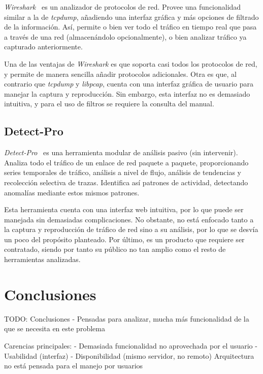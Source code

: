 \textit{Wireshark}~\cite{wireshark} es un analizador de protocolos de red.
Provee una funcionalidad similar a la de \textit{tcpdump}, añadiendo una interfaz gráfica y más opciones de filtrado de la información.
Así, permite o bien ver todo el tráfico en tiempo real que pasa a través de una red (almacenándolo opcionalmente), o bien analizar tráfico ya capturado anteriormente.

Una de las ventajas de \textit{Wireshark} es que soporta casi todos los protocolos de red, y permite de manera sencilla añadir protocolos adicionales.
Otra es que, al contrario que \textit{tcpdump} y \textit{libpcap}, cuenta con una interfaz gráfica de usuario para manejar la captura y reproducción.
Sin embargo, esta interfaz no es demasiado intuitiva, y para el uso de filtros se requiere la consulta del manual.

\subsection*{Detect-Pro\label{sec:eda:detectpro}}

\textit{Detect-Pro}~\cite{detectpro} es una herramienta modular de análisis pasivo (sin intervenir).
Analiza todo el tráfico de un enlace de red paquete a paquete, proporcionando series temporales de tráfico, análisis a nivel de flujo, análisis de tendencias y recolección selectiva de \glspl{traza}.
Identifica así patrones de actividad, detectando anomalías mediante estos mismos patrones.

Esta herramienta cuenta con una interfaz web intuitiva, por lo que puede ser manejada sin demasiadas complicaciones.
No obstante, no está enfocado tanto a la captura y reproducción de tráfico de red sino a su análisis, por lo que se desvía un poco del propósito planteado.
Por último, es un producto que requiere ser contratado, siendo por tanto su público no tan amplio como el resto de herramientas analizadas.

\section{Conclusiones\label{sec:eda:conclusiones}}

TODO: Conclusiones
  - Pensadas para analizar, mucha más funcionalidad de la que se necesita en este problema

Carencias principales:
  - Demasiada funcionalidad no aprovechada por el usuario
  - Usabilidad (interfaz)
  - Disponibilidad (mismo servidor, no remoto)
Arquitectura no está pensada para el manejo por usuarios
